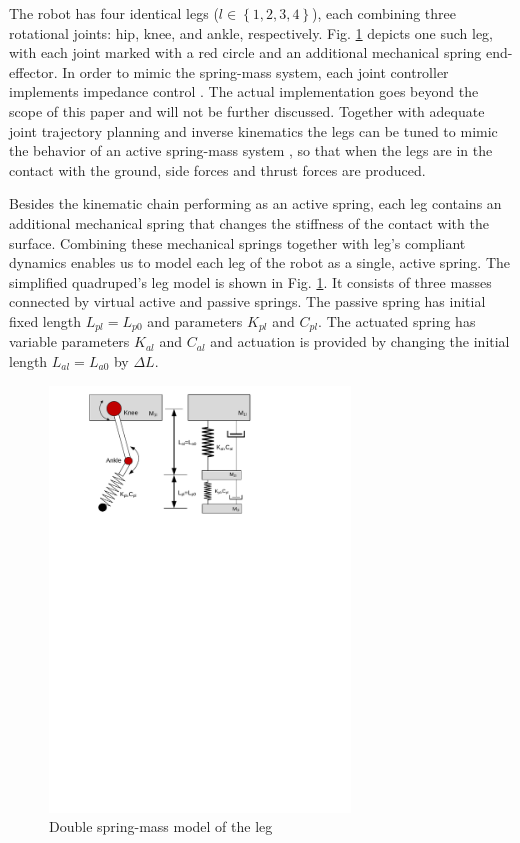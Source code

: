 

The robot has four identical legs ($l\in \left \{ 1,2,3,4 \right \}$), each combining three rotational joints: hip, knee, and ankle, respectively. Fig. \ref{fig:DynarobinLEG} depicts one such leg, with each joint marked with a red circle and an additional mechanical spring end-effector. In order to mimic the spring-mass system, each joint controller implements impedance control \cite{citeulike:2203614}. The actual implementation goes beyond the scope of this paper and will not be further discussed. Together with adequate joint trajectory planning and inverse kinematics the legs can be tuned to mimic the behavior of an active spring-mass system \cite{conf/iros/ParkP12}\cite{6171868}, so that when the legs are in the contact with the ground, side forces and thrust forces are produced.

Besides the kinematic chain performing as an active spring, each leg contains an additional mechanical spring that changes the stiffness of the contact with the surface. Combining these mechanical springs together with leg's compliant dynamics enables us to model each leg of the robot as a single, active spring. The simplified quadruped's leg model is shown in Fig. \ref{fig:DynarobinLEG}. It consists of three masses connected by virtual active and passive springs. The passive spring has initial fixed length $L_{pl}=L_{p0}$ and parameters $K_{pl}$ and $C_{pl}$.  The actuated spring has variable parameters $K_{al}$ and $C_{al}$ and actuation is provided by changing the initial length $L_{al}=L_{a0}$ by $\Delta L$.
\begin{figure}[t!]
	\centering
	\includegraphics[width=80mm]{./pictures/Dynarobin_leg.pdf}
	\caption{Double spring-mass model of the leg}
	\label{fig:DynarobinLEG}
\end{figure}
